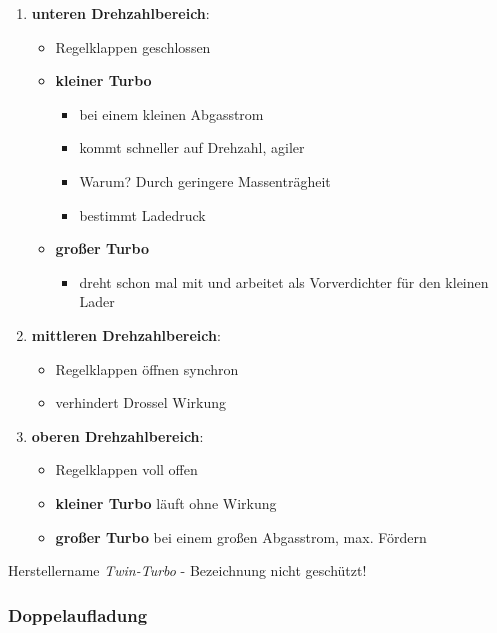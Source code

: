 \begin{enumerate}
\item
  \textbf{unteren Drehzahlbereich}:

  \begin{itemize}
  \item
    Regelklappen geschlossen
  \item
    \textbf{kleiner Turbo}

    \begin{itemize}
    \item
      bei einem kleinen Abgasstrom
    \item
      kommt schneller auf Drehzahl, agiler
    \item
      Warum? Durch geringere Massenträgheit
    \item
      bestimmt Ladedruck
    \end{itemize}
  \item
    \textbf{großer Turbo}

    \begin{itemize}
    \item
      dreht schon mal mit und arbeitet als Vorverdichter für den kleinen
      Lader
    \end{itemize}
  \end{itemize}
\item
  \textbf{mittleren Drehzahlbereich}:

  \begin{itemize}
  \item
    Regelklappen öffnen synchron
  \item
    verhindert Drossel Wirkung
  \end{itemize}
\item
  \textbf{oberen Drehzahlbereich}:

  \begin{itemize}
  \item
    Regelklappen voll offen
  \item
    \textbf{kleiner Turbo} läuft ohne Wirkung
  \item
    \textbf{großer Turbo} bei einem großen Abgasstrom, max. Fördern
  \end{itemize}
\end{enumerate}

Herstellername \emph{Twin-Turbo} - Bezeichnung nicht geschützt!

\subsubsection{Doppelaufladung}\label{doppelaufladung}

